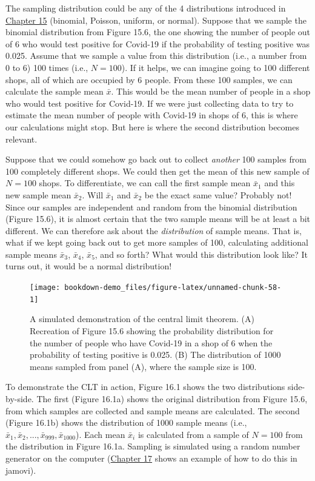 \documentclass[
  openany]{scrbook}
\begin{document}
The sampling distribution could be any of the 4 distributions introduced in \protect\hyperlink{Chapter_15}{Chapter 15} (binomial, Poisson, uniform, or normal).
Suppose that we sample the binomial distribution from Figure 15.6, the one showing the number of people out of 6 who would test positive for Covid-19 if the probability of testing positive was 0.025.
Assume that we sample a value from this distribution (i.e., a number from 0 to 6) 100 times (i.e., \(N = 100\)).
If it helps, we can imagine going to 100 different shops, all of which are occupied by 6 people.
From these 100 samples, we can calculate the sample mean \(\bar{x}\).
This would be the mean number of people in a shop who would test positive for Covid-19.
If we were just collecting data to try to estimate the mean number of people with Covid-19 in shops of 6, this is where our calculations might stop.
But here is where the second distribution becomes relevant.

Suppose that we could somehow go back out to collect \emph{another} 100 samples from 100 completely different shops.
We could then get the mean of this new sample of \(N = 100\) shops.
To differentiate, we can call the first sample mean \(\bar{x}_{1}\) and this new sample mean \(\bar{x}_{2}\).
Will \(\bar{x}_{1}\) and \(\bar{x}_{2}\) be the exact same value?
Probably not!
Since our samples are independent and random from the binomial distribution (Figure 15.6), it is almost certain that the two sample means will be at least a bit different.
We can therefore ask about the \emph{distribution} of sample means.
That is, what if we kept going back out to get more samples of 100, calculating additional sample means \(\bar{x}_{3}\), \(\bar{x}_{4}\), \(\bar{x}_{5}\), and so forth?
What would this distribution look like?
It turns out, it would be a normal distribution!

\begin{figure}
\texttt{[image: bookdown-demo\_files/figure-latex/unnamed-chunk-58-1]} \caption{A simulated demonstration of the central limit theorem. (A) Recreation of Figure 15.6 showing the probability distribution for the number of people who have Covid-19 in a shop of 6 when the probability of testing positive is 0.025. (B) The distribution of 1000 means sampled from panel (A), where the sample size is 100.}\label{fig:unnamed-chunk-58}
\end{figure}

To demonstrate the CLT in action, Figure 16.1 shows the two distributions side-by-side.
The first (Figure 16.1a) shows the original distribution from Figure 15.6, from which samples are collected and sample means are calculated.
The second (Figure 16.1b) shows the distribution of 1000 sample means (i.e., \(\bar{x}_{1}, \bar{x}_{2}, ..., \bar{x}_{999}, \bar{x}_{1000}\)).
Each mean \(\bar{x}_{i}\) is calculated from a sample of \(N = 100\) from the distribution in Figure 16.1a.
Sampling is simulated using a random number generator on the computer (\protect\hyperlink{Chapter_17}{Chapter 17} shows an example of how to do this in jamovi).
\end{document}
